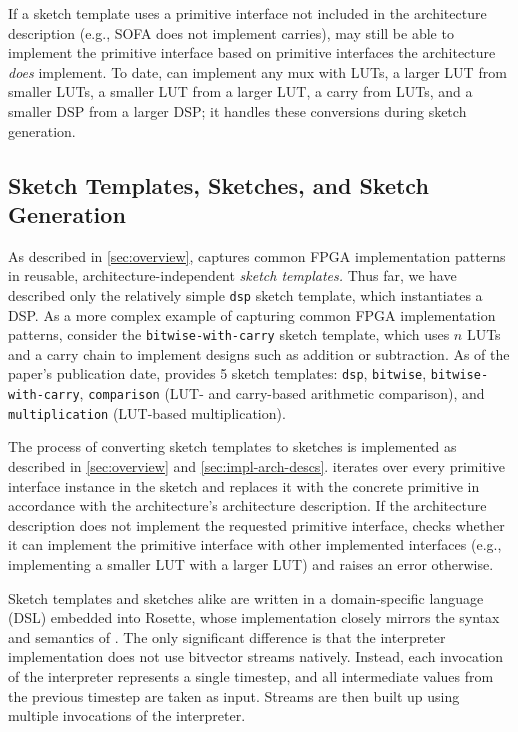If a sketch template uses a primitive interface
  not included in the architecture description
  (e.g., SOFA does not implement carries),
  \lr may still be able to implement the primitive interface
  based on primitive interfaces
  the architecture \textit{does} implement.
To date, \lr can implement any mux
  with LUTs, 
  a larger LUT from  smaller LUTs,
  a smaller LUT from a larger LUT,
  a carry from LUTs,
  and a smaller DSP from a larger DSP;
  it handles these conversions during sketch generation.


\subsection{Sketch Templates, Sketches, and Sketch Generation}

\label{sec:impl-sketch-templates}

As described in \cref{sec:overview},
  \lr 
  captures common FPGA implementation patterns
  in reusable, architecture-independent
  \textit{sketch templates.}
Thus far, we have described only 
  the relatively simple
  \texttt{dsp} sketch template,
  which instantiates a DSP.
As a more complex example
  of capturing common FPGA implementation patterns,
  consider
  the \texttt{bitwise-with-carry}
  sketch template, which
  uses $n$ LUTs and a carry chain
  to implement designs such as 
  addition or subtraction.
As of the paper's publication date, 
  \lr provides 5 sketch templates: 
  \texttt{dsp},
  \texttt{bitwise}, \texttt{bitwise-with-carry},
  \texttt{comparison} (LUT- and carry-based arithmetic comparison), 
  and
  \texttt{multiplication} (LUT-based multiplication).
 
The process of converting sketch templates
  to sketches
  is implemented as described in
  \cref{sec:overview}
  and \cref{sec:impl-arch-descs}.
\lr iterates over every
  primitive interface instance
  in the sketch
  and replaces it with
  the concrete primitive
  in accordance with
  the architecture's 
  architecture description.
If the architecture description
  does not implement the requested
  primitive interface,
  \lr checks whether it can implement
  the primitive interface with other
  implemented interfaces
  (e.g., implementing a smaller LUT with
  a larger LUT)
  and raises an error otherwise.

Sketch templates and sketches alike 
  are written in a domain-specific language (DSL)
  embedded into Rosette,
  whose implementation closely mirrors the syntax
  and semantics of \UberLang. 
The only significant difference is that
  the interpreter implementation
  does not use bitvector streams natively.
Instead, each invocation of the interpreter
  represents a single timestep,
  and all intermediate values from the previous timestep
  are taken as input.
Streams are then built up
  using multiple invocations of the interpreter.

